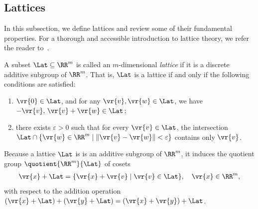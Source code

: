 \documentclass{fundam}
\begin{document}
\subsection{Lattices}\label{Lattices}
In this subsection, we define lattices and review some of their fundamental properties. For a thorough and accessible introduction to lattice theory, we refer the reader to~\cite{peikert2015decade}.

\vspace{0.5cm}
A subset $\Lat \subseteq \RR^m$ is called an $m$-dimensional \textit{lattice} if it is a discrete additive subgroup of $\RR^m$. That is, $\Lat$ is a lattice if and only if the following conditions are satisfied:
\begin{enumerate}
	\item $\vr{0} \in \Lat$, and for any $\vr{v}, \vr{w} \in \Lat$, we have $-\vr{v},\, \vr{v} + \vr{w} \in \Lat$;
	\item there exists $\varepsilon > 0$ such that for every $\vr{v} \in \Lat$, the intersection $\Lat \cap \{ \vr{w} \in \RR^m \mid \| \vr{v} - \vr{w} \| < \varepsilon \}$ contains only $\vr{v}$.
\end{enumerate}
%
%
Because a lattice $\Lat$ is is an additive subgroup of $\RR^{m}$, it induces the quotient group $\quotient{\RR^{m}}{\Lat}$ of cosets
\begin{align*}
	\vr{x} + \Lat = \{ \vr{x}+\vr{v} \mid \vr{v}\in\Lat  \}, ~~~\vr{x}\in\RR^{m},
\end{align*}
with respect to the addition operation $(\vr{x}+\Lat) + (\vr{y}+\Lat) = (\vr{x}+\vr{y}) + \Lat$.
%
\end{document}
